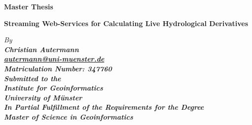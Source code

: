 \documentclass[english,
               paper=a4,
               fontsize=11pt,
               bibliography=totoc,
               listof=nochaptergap,
               listof=notoc,
               numbers=noendperiod,
               parskip=half,
               footnotes=multiple,
               toc=numberline,
               captions=tableheading,
               DIV=10,
              ]{scrreprt}
\newcommand{\mail}[1]{\href{mailto:#1}{#1}}
\renewenvironment{bold}{\bfseries}{}
\newenvironment{italic}{\itshape}{}
\newenvironment{sansserif}{\sffamily}{}
\begin{document}
  \begin{titlepage}
    \begin{spacing}{1}
      \begin{center}
        \begin{large}
          \begin{bold}
            Master Thesis\\
          \end{bold}
          \vspace*{\fill}
          \begin{huge}
            \begin{bold}
              \begin{sansserif}
                Streaming Web-Services for Calculating Live Hydrological Derivatives\\
              \end{sansserif}
            \end{bold}
          \end{huge}
          \vspace*{\fill}
          \begin{italic}
            By\\
          \end{italic}
          \begin{bold}
            Christian Autermann\\
          \end{bold}
          \mail{autermann@uni-muenster.de}\\
          Matriculation Number: 347760\\
          \vspace*{\fill}
          \begin{italic}
            Submitted to the\\
          \end{italic}
          Institute for Geoinformatics\\
          University of Münster\\
          \vspace*{\fill}
          \begin{italic}
            In Partial Fulfillment of the Requirements for the Degree\\
          \end{italic}
          \begin{bold}
            Master of Science in Geoinformatics\\
          \end{bold}
          \vspace*{\fill}

\end{large}
\end{center}
\end{spacing}
\end{titlepage}
\end{document}
